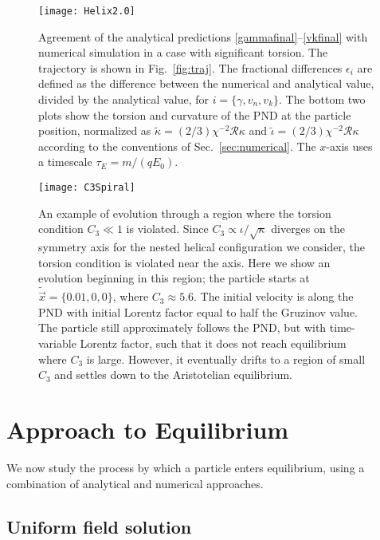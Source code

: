 \documentclass[amsmath,amssymb,nofootinbib,notitlepage,superscriptaddress,twocolumn]{revtex4-2}
\begin{document}
\begin{figure}
    \centering    \texttt{[image: Helix2.0]}\\
    \caption{Agreement of the analytical predictions \eqref{gammafinal}--\eqref{vkfinal} with numerical simulation in a case with significant torsion.  The trajectory is shown in Fig.~\ref{fig:traj}.  The fractional differences $\epsilon_i$ are defined as the difference between the numerical and analytical value, divided by the analytical value, for $i=\{\gamma,v_n,v_k\}$.  The bottom two plots show the torsion and curvature of the PND at the particle position, normalized as $\tilde{\kappa}=(2/3)\chi^{-2} \mathcal{R} \kappa$ and $\tilde{\iota}=(2/3)\chi^{-2} \mathcal{R} \kappa$ according to the conventions of Sec.~\ref{sec:numerical}.  The $x$-axis uses a timescale $\tau_E=m/(q E_0)$.
    }
    \label{fig:helix}
\end{figure}

\begin{figure*}
     \centering
\texttt{[image: C3Spiral]}
\caption{An example of evolution through a region where the torsion condition $C_3 \ll 1$ is violated.  Since $C_3\propto \iota/\sqrt{\kappa}$ diverges on the symmetry axis for the nested helical configuration we consider, the torsion condition is violated near the axis.  Here we show an evolution beginning in this region; the particle starts at $\tilde{\vec{x}}=\{0.01,0,0\}$, where $C_3 \approx 5.6$.  The initial velocity is along the PND with initial Lorentz factor equal to half the Gruzinov value.  The particle still approximately follows the PND, but with time-variable Lorentz factor, such that it does not reach equilibrium where $C_3$ is large.  However, it eventually drifts to a region of small $C_3$ and settles down to the Aristotelian equilibrium.\label{fig:spiral}}
 \end{figure*}


\section{Approach to Equilibrium}\label{sec:approach}

We now study the process by which a particle enters equilibrium, using a combination of analytical and numerical approaches.

\subsection{Uniform field solution}\label{sec:uniform}
\end{document}
